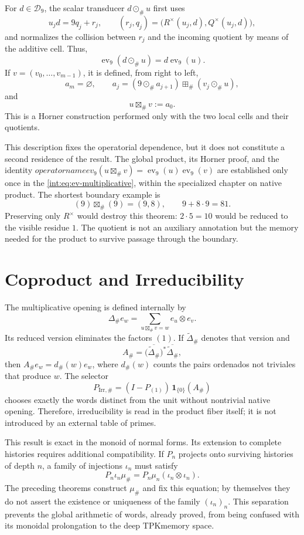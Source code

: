 For \(d\in\mathcal D_9\), the scalar transducer \(d\odot_\#u\) first uses
\[
 u_jd=9q_j+r_j,\qquad
 (r_j,q_j)=\bigl(R^\times(u_j,d),Q^\times(u_j,d)\bigr),
\]
and normalizes the collision between \(r_j\) and the incoming quotient by means of the
additive cell. Thus,
\[
 \operatorname{ev}_9(d\odot_\#u)
 =d\operatorname{ev}_9(u).
\]
If \(v=(v_0,\ldots,v_{m-1})\), it is defined, from right to left,
\[
 a_m=\varnothing,\qquad
 a_j=(9\odot_\#a_{j+1})\boxplus_\#(v_j\odot_\#u),
\]
and
\[
 u\boxtimes_\#v:=a_0.
\]
This is a Horner construction performed only with
the two local cells and their quotients.

This description fixes the operatorial dependence, but it does not constitute a
second residence of the result. The global product, its Horner proof, and
the identity
\(operatorname{ev}_9(u\boxtimes_\#v)
=\operatorname{ev}_9(u)\operatorname{ev}_9(v)\)
are established only once in the
\cref{int:eq:ev-multiplicative}, within the specialized chapter on native
product.
The shortest boundary example is
\[
 (9)\boxtimes_\#(9)=(9,8),\qquad 9+8\cdot9=81.
\]
Preserving only \(R^\times\) would destroy this theorem: \(2\cdot5=10\)
would be reduced to the visible residue \(1\). The quotient is not an auxiliary
annotation but the memory needed for the product to survive passage through
the boundary.

\section{Coproduct and Irreducibility}

The multiplicative opening is defined internally by
\[
 \Delta_\#e_w
 =\sum_{u\boxtimes_\#v=w}e_u\otimes e_v.
\]
Its reduced version eliminates the factors \((1)\). If
\(\widetilde\Delta_\#\) denotes that version and
\[
 A_\#=
 \bigl(\overline{\widetilde\Delta_\#}\bigr)^*
 \overline{\widetilde\Delta_\#},
\]
then \(A_\#e_w=d_\#(w)e_w\), where \(d_\#(w)\) counts the pairs ordenados
not triviales that produce \(w\). The selector
\[
 P_{\mathrm{Irr},\#}
 =(I-P_{(1)})\,\mathbf1_{\{0\}}(A_\#)
\]
chooses exactly the words distinct from the unit without nontrivial native
opening. Therefore, irreducibility is read in the product fiber itself;
it is not introduced by an external table of primes.

This result is exact in the monoid of normal forms. Its extension to
complete histories requires additional compatibility. If \(P_n\) projects
onto surviving histories of depth \(n\), a family of
injections \(\iota_n\) must satisfy
\[
 P_n\iota_n\mu_\#
 =P_n\mu_n(\iota_n\otimes\iota_n).
\]
The preceding theorems construct \(\mu_\#\) and fix this equation; by
themselves they do not assert the existence or uniqueness of the family
\((\iota_n)_n\). This separation prevents the global arithmetic of
words, already proved, from being confused with its monoidal prolongation to the deep
TPK\@ memory space.

